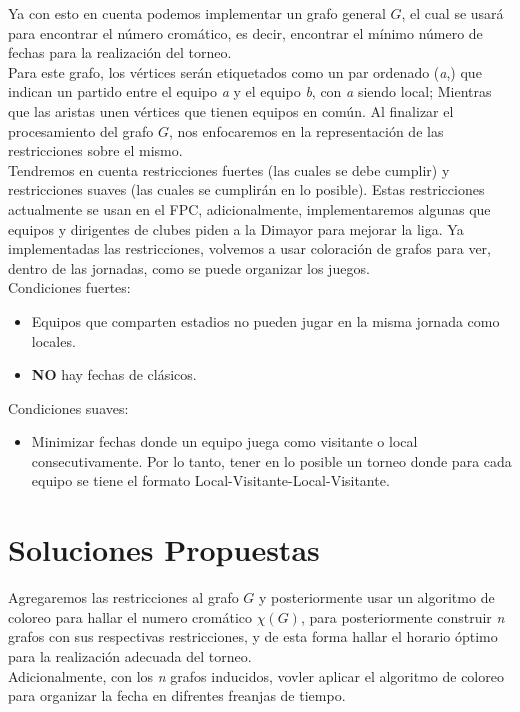 \documentclass[11pt]{article}
\begin{document}
\begin{multicols}{2}
            Ya con esto en cuenta podemos implementar un grafo general $G$, el cual se usará para 
            encontrar el número cromático, es decir, encontrar el mínimo número de fechas para la 
            realización del torneo.\\
            Para este grafo, los vértices serán etiquetados como un par ordenado (\textit{a},) que indican un 
            partido entre el equipo \textit{a} y el equipo \textit{b}, con \textit{a} siendo local; Mientras que las aristas unen 
            vértices que tienen equipos en común. Al finalizar el procesamiento del grafo $G$, nos enfocaremos en la representación de las restricciones
            sobre el mismo.\\[10pt]
            Tendremos en cuenta restricciones fuertes (las cuales se debe cumplir) y restricciones 
            suaves (las cuales se cumplirán en lo posible). Estas restricciones 
            actualmente se usan en el FPC, adicionalmente, implementaremos algunas que equipos y 
            dirigentes de clubes piden a la Dimayor para mejorar la liga. Ya implementadas las 
            restricciones, volvemos a usar coloración de grafos para ver, dentro de las jornadas, como 
            se puede organizar los juegos.\\[10pt]
            Condiciones fuertes:
            \begin{itemize}
                \item Equipos que comparten estadios no pueden jugar en la misma jornada como locales.
                \item \textbf{NO} hay fechas de clásicos.
            \end{itemize}
            Condiciones suaves:
            \begin{itemize}  
                \item Minimizar fechas donde un equipo juega como visitante o local consecutivamente. 
                Por lo tanto, tener en lo posible un torneo donde para cada equipo se tiene 
                el formato Local-Visitante-Local-Visitante.     
            \end{itemize}

        \section{Soluciones Propuestas}
            
            Agregaremos las restricciones al grafo $G$ y posteriormente usar un algoritmo de coloreo para hallar el numero cromático $\chi(G)$, para 
            posteriormente construir \textit{n} grafos con sus respectivas restricciones, y de esta forma 
            hallar el horario óptimo para la realización adecuada del torneo.\\
            Adicionalmente, con los \textit{n} grafos inducidos, vovler aplicar el algoritmo de coloreo para organizar la fecha en difrentes
            freanjas de tiempo.
            
        
        

    \end{multicols}
\end{document}
